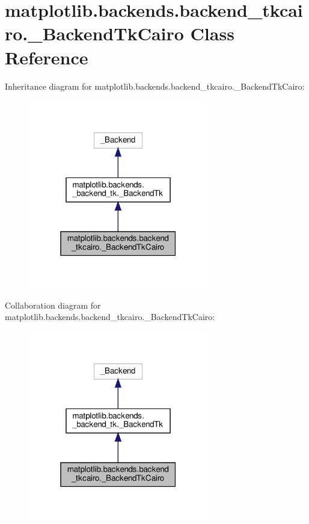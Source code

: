 \hypertarget{classmatplotlib_1_1backends_1_1backend__tkcairo_1_1__BackendTkCairo}{}\section{matplotlib.\+backends.\+backend\+\_\+tkcairo.\+\_\+\+Backend\+Tk\+Cairo Class Reference}
\label{classmatplotlib_1_1backends_1_1backend__tkcairo_1_1__BackendTkCairo}


Inheritance diagram for matplotlib.\+backends.\+backend\+\_\+tkcairo.\+\_\+\+Backend\+Tk\+Cairo\+:
\nopagebreak
\begin{figure}[H]
\begin{center}
\leavevmode
\includegraphics[width=223pt]{classmatplotlib_1_1backends_1_1backend__tkcairo_1_1__BackendTkCairo__inherit__graph}
\end{center}
\end{figure}


Collaboration diagram for matplotlib.\+backends.\+backend\+\_\+tkcairo.\+\_\+\+Backend\+Tk\+Cairo\+:
\nopagebreak
\begin{figure}[H]
\begin{center}
\leavevmode
\includegraphics[width=223pt]{classmatplotlib_1_1backends_1_1backend__tkcairo_1_1__BackendTkCairo__coll__graph}
\end{center}
\end{figure}
